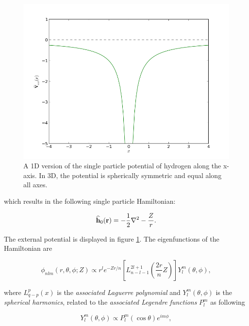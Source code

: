 \begin{figure}
 \begin{center}
  \includegraphics[scale=0.5]{../Graphics/Potentials/hydrogen.png}
  \caption{A 1D version of the single particle potential of hydrogen along the x-axis. In 3D, the potential is spherically symmetric and equal along all axes.}
  \label{fig:extPotHydrogen}
 \end{center}
\end{figure}

which results in the following single particle Hamiltonian:

\begin{equation}
 {\bf\widehat{h}}_0(\mathbf{r}) = -\frac{1}{2}\nabla^2 - \frac{Z}{r}.
\end{equation}

The external potential is displayed in figure \ref{fig:extPotHydrogen}. The eigenfunctions of the Hamiltonian are

\begin{equation}
 \phi_{nlm}(r, \theta, \phi; Z) \propto r^l e^{-Zr/n}\left[L_{n-l-1}^{2l+1}\left(\frac{2r}{n}Z\right)\right] Y_l^m(\theta, \phi), \label{eq:hydrogenBasisComplex}
\end{equation}

where $L_{q-p}^p(x)$ is the \textit{associated Laguerre polynomial} and $Y_l^m(\theta, \phi)$ is the \textit{spherical harmonics}, related to the \textit{associated Legendre functions} $P_l^m$ as following

\begin{equation}
 Y_l^m(\theta, \phi) \propto   P_l^m(\cos\theta)e^{im\phi}, \label{eq:spherHarm}
\end{equation}

